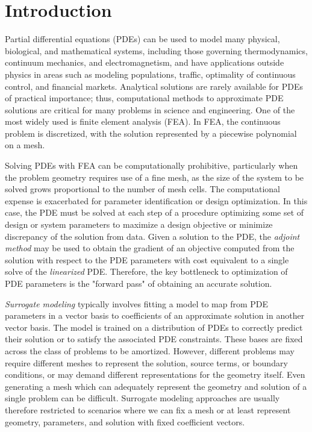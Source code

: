 \section{Introduction}
\label{sec:metapde-intro}
Partial differential equations (PDEs) can be used to model many
physical, biological, and mathematical systems, including those governing
thermodynamics, continuum mechanics, and electromagnetism, and have applications
outside physics in areas such as modeling populations, traffic,
optimality of continuous control, and financial markets.
Analytical solutions are rarely available for PDEs of practical importance;
thus, computational methods to approximate PDE solutions are critical for many problems in science and engineering.
One of the most widely used is finite element analysis (FEA).
In FEA, the continuous problem is discretized, with the solution represented by a
piecewise polynomial on a mesh.

Solving PDEs with FEA can be computationally prohibitive, particularly when the problem
geometry requires use of a fine mesh, as the size of the system to be solved grows
proportional to the number of mesh cells.
The computational expense is exacerbated for parameter identification or design
optimization.
In this case, the PDE must be solved at each step of a procedure optimizing some set of
design or system parameters to maximize a design objective or minimize discrepancy of
the solution from data.
Given a solution to the PDE, the \emph{adjoint method}
\citep{lions1971optimal,mitusch2019dolfin} may be used to obtain the gradient of
an objective computed from the solution with respect to the PDE parameters with cost
equivalent to a single solve of the \emph{linearized} PDE.
Therefore, the key bottleneck to optimization of PDE parameters is the "forward pass"
of obtaining an accurate solution.

\emph{Surrogate modeling} typically involves fitting a model to map from PDE parameters
in a vector basis to coefficients of an approximate solution in another vector basis.
The model is trained on a distribution of PDEs to correctly predict their solution
or to satisfy the associated PDE constraints.
These bases are fixed across the class of problems to be amortized.
However, different problems may require different meshes to represent the solution,
source terms, or boundary conditions, or may demand different representations
for the geometry itself.
Even generating a mesh which can adequately represent the geometry and solution
of a single problem can be difficult.
Surrogate modeling approaches are usually therefore restricted to scenarios where we
can fix a mesh or at least represent geometry, parameters, and solution with
fixed coefficient vectors.

